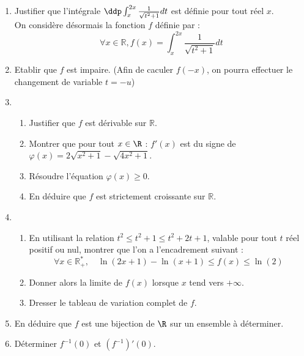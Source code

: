 \documentclass[a4paper, 11pt,reqno]{article}
\begin{document}
\begin{exercice}
\begin{enumerate}
\item Justifier que l'intégrale $\ddp \int_x^{2 x} \frac{1}{\sqrt{t^2+1}} d t$ est définie pour tout réel $x$.\\
On considère désormais la fonction $f$ définie par :
$$
\forall x \in \mathbb{R}, f(x)=\int_x^{2 x} \frac{1}{\sqrt{t^2+1}} d t
$$
\item  Etablir que $f$ est impaire. (Afin de caculer $f(-x)$, on pourra effectuer le changement de variable $t=-u$)
\item \begin{enumerate}
\item Justifier que $f$ est  dérivable  sur $\mathbb{R}$.
\item Montrer que pour tout $x\in \R$ :
$f'(x) $ est du signe de $\varphi(x)= 2\sqrt{x^2+1} -\sqrt{4x^2+1}$. 
\item Résoudre l'équation $\varphi(x)\geq 0$.
\item  En déduire que $f$ est strictement croissante sur $\mathbb{R}$.
\end{enumerate}
\item 
\begin{enumerate}
\item En utilisant la relation $t^2 \leqslant t^2+1 \leqslant t^2+2 t+1$, valable pour tout $t$ réel positif ou nul, montrer que l'on a l'encadrement suivant :
$$
\forall x \in \mathbb{R}_{+}^*, \quad \ln (2 x+1)-\ln (x+1) \leqslant f(x) \leqslant \ln (2)
$$
\item Donner alors la limite de $f(x)$ lorsque $x$ tend vers $+\infty$.
\item Dresser le tableau de variation complet de $f$.
\end{enumerate}
\item En déduire que $f$ est une bijection de $\R$ sur un ensemble à déterminer. 
\item Déterminer $f^{-1} (0) $ et  $(f^{-1})' (0)$.
\end{enumerate}
\end{exercice}
\begin{correction}

\end{correction}

\vspace{0.5cm}
\newpage
\end{document}
